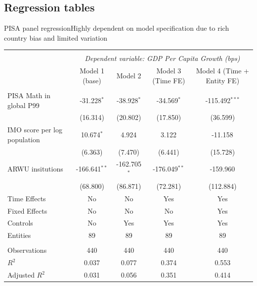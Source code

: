 \documentclass[10pt]{beamer}
\begin{document}
\subsection{Regression tables}
\begin{frame}{PISA panel regression}{Highly dependent on model specification due to rich country bias and limited variation}
    \begin{table}[!htbp] \centering
        \resizebox{\linewidth}{!} {
            \begin{tabular}{@{\extracolsep{5pt}}lcccc}
                \\[-1.8ex]\hline
                \hline \\[-1.8ex]
                & \multicolumn{4}{c}{\textit{Dependent variable: GDP Per Capita Growth (bps)}} \
                \cr \cline{2-5}
                \\[-1.8ex] & \multicolumn{1}{c}{Model 1 (base)} & \multicolumn{1}{c}{Model 2} & \multicolumn{1}{c}{Model 3 (Time FE)} & \multicolumn{1}{c}{Model 4 (Time + Entity FE)}  \\
                \hline \\[-1.8ex]
                 PISA Math in global P99 & -31.228$^{*}$ & -38.928$^{*}$ & -34.569$^{*}$ & -115.492$^{***}$ \\
                & (16.314) & (20.802) & (17.850) & (36.599) \\
                 IMO score per log population & 10.674$^{*}$ & 4.924$^{}$ & 3.122$^{}$ & -11.158$^{}$ \\
                & (6.363) & (7.470) & (6.441) & (15.728) \\
                 ARWU insitutions & -166.641$^{**}$ & -162.705$^{*}$ & -176.049$^{**}$ & -159.960$^{}$ \\
                & (68.800) & (86.871) & (72.281) & (112.884) \\
                 Time Effects & No & No & Yes & Yes \\
                 Fixed Effects & No & No & No & Yes \\
                 Controls & No & Yes & Yes & Yes \\
                 Entities & 89 & 89 & 89 & 89 \\
                \hline \\[-1.8ex]
                 Observations & 440 & 440 & 440 & 440 \\
                 $R^2$ & 0.037 & 0.077 & 0.374 & 0.553 \\
                 Adjusted $R^2$ & 0.031 & 0.056 & 0.351 & 0.414 \\

\end{tabular}}
\end{table}
\end{frame}
\end{document}
